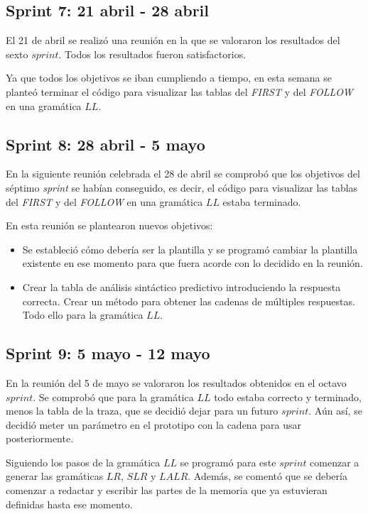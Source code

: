 \subsection{Sprint 7: 21 abril - 28 abril}
El 21 de abril se realizó una reunión en la que se valoraron los resultados del sexto $sprint$. Todos los resultados fueron satisfactorios.

Ya que todos los objetivos se iban cumpliendo a tiempo, en esta semana se planteó terminar el código para visualizar las tablas del \textit{FIRST} y del \textit{FOLLOW} en una gramática $LL$.


\subsection{Sprint 8: 28 abril - 5 mayo}
En la siguiente reunión celebrada el 28 de abril se comprobó que los objetivos del séptimo \textit{sprint} se habían conseguido, es decir, el código para visualizar las tablas del \textit{FIRST} y del \textit{FOLLOW} en una gramática $LL$ estaba terminado.

En esta reunión se plantearon nuevos objetivos:
\begin{itemize}
\item Se estableció cómo debería ser la plantilla y se programó cambiar la plantilla existente en ese momento para que fuera acorde con lo decidido en la reunión.
\item Crear la tabla de análisis sintáctico predictivo introduciendo la respuesta correcta. Crear un método para obtener las cadenas de múltiples respuestas. Todo ello para la gramática $LL$. 
\end{itemize}



\subsection{Sprint 9: 5 mayo - 12 mayo}
En la reunión del 5 de mayo se valoraron los resultados obtenidos en el octavo $sprint$. Se comprobó que para la gramática $LL$ todo estaba correcto y terminado, menos la tabla de la traza, que se decidió dejar para un futuro $sprint$. Aún así, se decidió meter un parámetro en el prototipo con la cadena para usar posteriormente.

Siguiendo los pasos de la gramática $LL$ se programó para este $sprint$ comenzar a generar las gramáticas $LR$, $SLR$ y $LALR$.
Además, se comentó que se debería comenzar a redactar y escribir las partes de la memoria que ya estuvieran definidas hasta ese momento.




